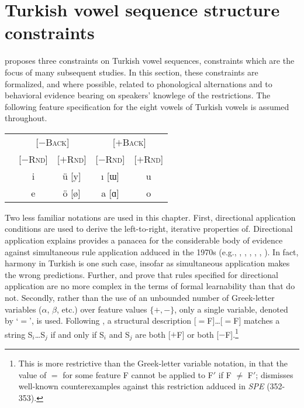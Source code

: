 \section{Turkish vowel sequence structure constraints}

\citet{Lees1966b,Lees1966a} proposes three constraints on Turkish vowel sequences, constraints which are the focus of many subsequent studies. In this section, these constraints are formalized, and where possible, related to phonological alternations and to behavioral evidence bearing on speakers' knowlege of the restrictions. The following feature specification for the eight vowels of Turkish vowels is assumed throughout.

\begin{example}
\begin{tabular}{c c c c c}
                       & \multicolumn{2}{c}{[$-$\textsc{Back}]} & \multicolumn{2}{c}{[$+$\textsc{Back}]} \\
                       & [$-$\textsc{Rnd}] & [$+$\textsc{Rnd}] & [$-$\textsc{Rnd}] & [$+$\textsc{Rnd}] \\ 
\cmidrule{2-5}
 & {i} & {ü} [y] & {ı} [ɯ] & {u} \\
 & {e} & {ö} [ø] & {a} [ɑ] & {o} \\
\end{tabular}
\end{example}

Two less familiar notations are used in this chapter. First, directional application conditions are used to derive the left-to-right, iterative properties of. Directional application explains provides a panacea for the considerable body of evidence against simultaneous rule application adduced in the 1970s (e.g., \citealt[209f.]{Anderson1974}, \citealt{Howard1972}, \citeauthor{Kenstowicz1973} \citeyear[14f.]{Kenstowicz1973}, \citeyear[189f.]{Kenstowicz1977}, \citeyear[318f.]{Kenstowicz1979}, \citealt{Piggott1975}). In fact, harmony in Turkish is one such case, insofar as simultaneous application makes the wrong predictions. Further, \citet{Johnson1972} and \citet{Kaplan1994} prove that rules specified for directional application are no more complex in the terms of formal learnability than that do not. Secondly, rather than the use of an unbounded number of Greek-letter variables ($\alpha$, $\beta$, etc.) over feature values $\{+, -\}$, only a single variable, denoted by `$=$', is used. Following \citet{McCawley1973}, a structural description [$=$F]\ldots{}[$=$F] matches a string S$_i$\ldots{}S$_j$ if and only if S$_i$ and S$_j$ are both [$+$F] or both [$-$F].\footnote{This is more restrictive than the Greek-letter variable notation, in that the value of $=$ for some feature F cannot be applied to F$'$ if F $\ne$ F$'$; \citet{Odden2012} dismisses well-known counterexamples against this restriction adduced in \emph{SPE} (352-353).}


